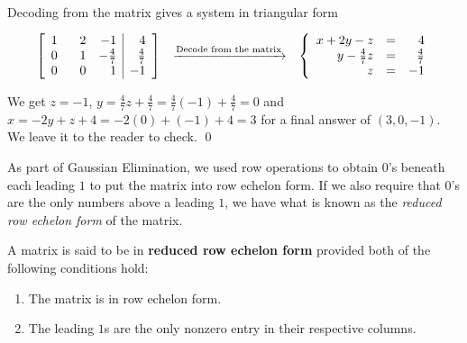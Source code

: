 \documentclass{ximera}
\begin{document}
\begin{example}
\[\begin{array}{ccc}
\end{array}\]

Decoding from the matrix gives a system in triangular form

\[ \begin{array}{ccc}

\left[ \begin{array}{rrr|r} 
1 & \hphantom{-}2 & -1 & 4 \\ 
0 & 1 & -\frac{4}{7} & \frac{4}{7} \\ 
0 & 0 &1 & -1 \\ 
\end{array} \right]  
& 
\xrightarrow{\text{Decode from the matrix}} 
& 
\left \{ \begin{array}{rcr} 
x + 2y-z & = & 4 \\ 
y - \frac{4}{7} z & = & \frac{4}{7} \\ 
z & = & -1 \end{array} \right.

\end{array}\]

We get $z=-1$,  $y = \frac{4}{7} z + \frac{4}{7} = \frac{4}{7}(-1)+\frac{4}{7} = 0$ and $x = -2y+z+4 = -2(0)+(-1)+4 = 3$ for a final answer of $(3,0,-1)$.  We leave it to the reader to check. \qed

\end{example}

As part of Gaussian Elimination, we used row operations to obtain $0$'s beneath each leading $1$ to put the matrix into row echelon form.  If we also require that $0$'s are the only numbers above a leading $1$, we have what is known as  the   \textit{reduced row echelon form} of the matrix.

\smallskip

\colorbox{ResultColor}{\bbm  

\begin{definition} \label{reducedrowechelonform} A matrix is said to be in \textbf{reduced row echelon form} provided both of the following conditions hold:

\begin{enumerate}

\item  The matrix is in row echelon form.

\item The leading $1$s are the only nonzero entry in their respective columns.

\end{enumerate}

\end{definition}

\ebm}
\end{document}
